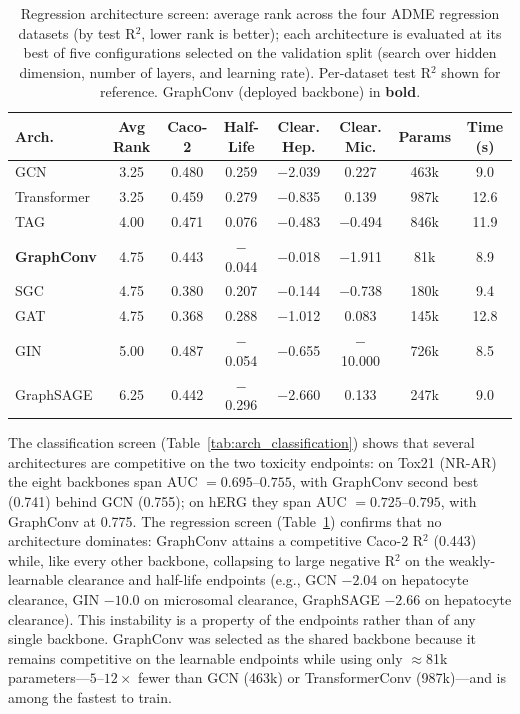 \documentclass[journal,onecolumn]{IEEEtran}
\begin{document}
\begin{table}[H]
\centering
\caption{Regression architecture screen: average rank across the four ADME regression datasets (by test R$^2$, lower rank is better); each architecture is evaluated at its best of five configurations selected on the validation split (search over hidden dimension, number of layers, and learning rate). Per-dataset test R$^2$ shown for reference. GraphConv (deployed backbone) in \textbf{bold}.}
\label{tab:arch_regression}
\small
\setlength{\tabcolsep}{4pt}
\begin{tabular}{lccccccc}
\toprule
\textbf{Arch.} & \textbf{Avg Rank} & \textbf{Caco-2} & \textbf{Half-Life} & \textbf{Clear. Hep.} & \textbf{Clear. Mic.} & \textbf{Params} & \textbf{Time (s)} \\
\midrule
GCN & 3.25 & 0.480 & 0.259 & $-$2.039 & 0.227 & 463k & 9.0 \\
Transformer & 3.25 & 0.459 & 0.279 & $-$0.835 & 0.139 & 987k & 12.6 \\
TAG & 4.00 & 0.471 & 0.076 & $-$0.483 & $-$0.494 & 846k & 11.9 \\
\textbf{GraphConv} & 4.75 & 0.443 & $-$0.044 & $-$0.018 & $-$1.911 & 81k & 8.9 \\
SGC & 4.75 & 0.380 & 0.207 & $-$0.144 & $-$0.738 & 180k & 9.4 \\
GAT & 4.75 & 0.368 & 0.288 & $-$1.012 & 0.083 & 145k & 12.8 \\
GIN & 5.00 & 0.487 & $-$0.054 & $-$0.655 & $-$10.000 & 726k & 8.5 \\
GraphSAGE & 6.25 & 0.442 & $-$0.296 & $-$2.660 & 0.133 & 247k & 9.0 \\
\bottomrule
\end{tabular}
\end{table}

The classification screen (Table~\ref{tab:arch_classification}) shows that several architectures are competitive on the two toxicity endpoints: on Tox21 (NR-AR) the eight backbones span AUC $=0.695$--$0.755$, with GraphConv second best (0.741) behind GCN (0.755); on hERG they span AUC $=0.725$--$0.795$, with GraphConv at 0.775. The regression screen (Table~\ref{tab:arch_regression}) confirms that no architecture dominates: GraphConv attains a competitive Caco-2 R$^2$ (0.443) while, like every other backbone, collapsing to large negative R$^2$ on the weakly-learnable clearance and half-life endpoints (e.g., GCN $-2.04$ on hepatocyte clearance, GIN $-10.0$ on microsomal clearance, GraphSAGE $-2.66$ on hepatocyte clearance). This instability is a property of the endpoints rather than of any single backbone. GraphConv was selected as the shared backbone because it remains competitive on the learnable endpoints while using only $\approx$81k parameters—$5$--$12\times$ fewer than GCN (463k) or TransformerConv (987k)—and is among the fastest to train.
\end{document}
